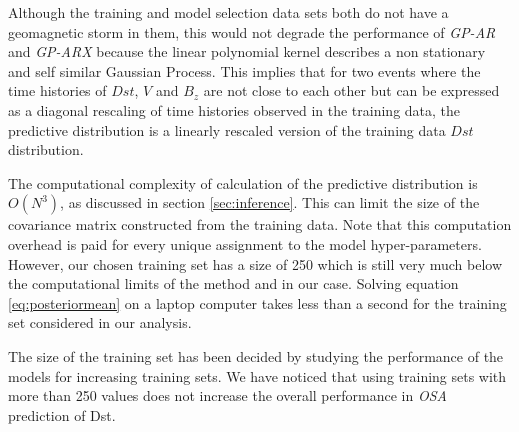 \documentclass[draft,sw]{AGUTeX}
\begin{document}
\begin{article}
Although the training and model selection data sets both do not have a geomagnetic storm in them, this would not degrade the performance of \emph{GP-AR} and \emph{GP-ARX} because the linear polynomial kernel describes a non stationary and self similar Gaussian Process. This implies that for two events where the time histories of $Dst$, $V$ and $B_z$ are not close to each other but can be expressed as a diagonal rescaling of time histories observed in the training data, the predictive distribution is a linearly rescaled version of the training data $Dst$ distribution. 

The computational complexity of calculation of the predictive distribution is $O(N^3)$, as discussed in section \ref{sec:inference}. This can limit the size of the covariance matrix constructed from the training data. Note that this computation overhead is paid for every unique assignment to the model hyper-parameters. However, our chosen training set has a size of 250 which is still very much below the computational limits of the method and in our case. Solving equation \ref{eq:posteriormean} on a laptop computer takes less than a second for the training set considered in our analysis. 

The size of the training set has been decided by studying the performance of the models for increasing training sets. We have noticed that using training sets with more than 250 values does not increase the overall performance in \emph{OSA} prediction of Dst. 




%
%
%
%
%

%


\end{article}
\end{document}
